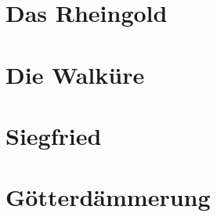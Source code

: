 \documentclass[a5paper]{memoir}
\providecommand{\saythescene}{Akt {\printactnum}, Szene {\printscenenum}}
\begin{document}

\let\oldsaythescene\saythescene
\renewcommand{\saythescene}{Szene \printscenenum}
\providecommand{\playname}{Das Rheingold}
\part{Das Rheingold}


\cleardoublepage

\part{Die Walk\"ure}
\let\saythescene\oldsaythescene
\renewcommand{\playname}{Die Walküre}
\setcounter{act}{0}


\part{Siegfried}
\setcounter{act}{0}
\renewcommand{\playname}{Siegfried}


\renewcommand{\playname}{Götterdämmerung}
\setcounter{act}{0}
\setcounter{scene}{0}
\part{G\"otterd\"ammerung}

\end{document}
